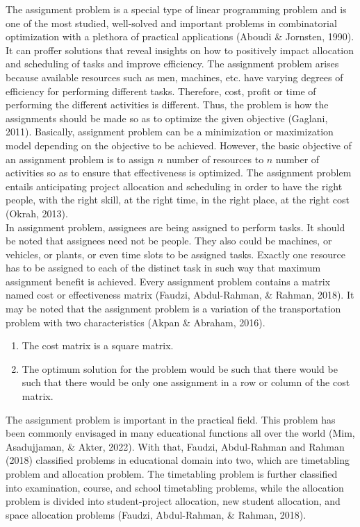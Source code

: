 \documentclass[11pt]{report}
\newcommand{\NI}{\noindent}
\begin{document}
	\NI The assignment problem is a special type of linear programming problem and is one of the most studied, well-solved and important problems in combinatorial optimization with a plethora of practical applications (Aboudi \& Jornsten, 1990). It can proffer solutions that reveal insights on how to positively impact allocation and scheduling of tasks and improve efficiency. The assignment problem arises because available resources such as men, machines, etc. have varying degrees of efficiency for performing different tasks. Therefore, cost, profit or time of performing the different activities is different. Thus, the problem is how the assignments should be made so as to optimize the given objective (Gaglani, 2011). Basically, assignment problem can be a minimization or maximization model depending on the objective to be achieved. However, the
	basic objective of an assignment problem is to assign $n$ number of resources to $n$ number of activities so as to ensure that effectiveness is optimized. The assignment problem entails anticipating project allocation and scheduling in order to have the right people, with the right skill, at the right time, in the right place, at the right cost (Okrah, 2013).\\
	
	\NI In assignment problem, assignees are being assigned to perform tasks. It should be noted that assignees need not be people. They also could be machines, or vehicles, or plants, or even time slots to be assigned tasks. Exactly one resource has to be assigned to each of the distinct task in
	such way that maximum assignment benefit is achieved. Every assignment problem contains a matrix named cost or effectiveness matrix (Faudzi, Abdul-Rahman, \& Rahman, 2018). It may be noted that the assignment problem is a variation of the transportation problem with two characteristics (Akpan \& Abraham, 2016).
	
	\begin{enumerate}
		\item The cost matrix is a square matrix.
		\item The optimum solution for the problem would be such that there would be such that there would be only one assignment in a row or column of the cost matrix.
	\end{enumerate}
	
	\NI The assignment problem is important in the practical field. This problem has been commonly envisaged in many educational functions all over the world (Mim, Asadujjaman, \& Akter, 2022). With that, Faudzi, Abdul-Rahman and Rahman (2018) classified problems in educational domain into two, which are timetabling problem and allocation problem. The timetabling problem is further classified into examination, course, and school timetabling problems, while the allocation
	problem is divided into student-project allocation, new student allocation, and space allocation problems (Faudzi, Abdul-Rahman, \& Rahman, 2018).\\
	
\end{document}
